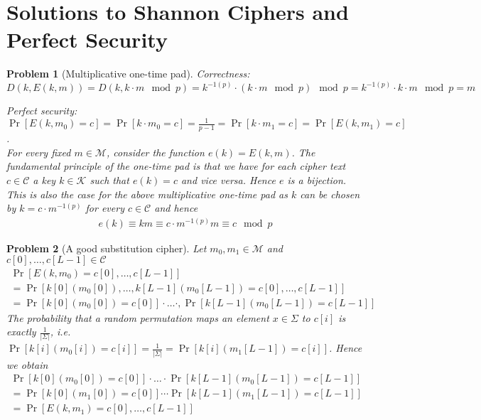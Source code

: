 \documentclass[USenglish,a4paper,12pt]{scrartcl}
\author{Kim Klein}
\date{April 2019}
\theoremstyle{break}
\newtheorem{exerc}{Problem}
\begin{document}
\section*{Solutions to Shannon Ciphers and Perfect Security}



\begin{exerc}[Multiplicative one-time pad]
Correctness: $D(k,E(k,m))= D(k,k \cdot m \mod p) = k^{-1 (p)} \cdot (k \cdot m \mod p) \mod p = k^{-1 (p)} \cdot k \cdot m \mod p = m$


Perfect security: $\Pr[E(k,m_0) = c] = \Pr[k \cdot m_0 = c] = \frac{1}{p-1} = \Pr[k \cdot m_1 = c] = \Pr[E(k,m_1) = c]$.\\


For every fixed $m \in \mathcal{M}$, consider the function $e(k) = E(k,m)$.
The fundamental principle of the one-time pad is that we have for each cipher text $c \in \mathcal{C}$ a key $k \in \mathcal{K}$ such that $e(k) = c$ and vice versa. Hence $e$ is a bijection. This is also the case for the above multiplicative one-time pad as $k$ can be chosen by $k = c \cdot m^{-1 (p)}$ for every $c \in \mathcal{C}$ and hence
\begin{align*}
    e(k) \equiv km \equiv c \cdot m^{-1 (p)} m \equiv c \mod p
\end{align*}
\end{exerc}



\begin{exerc}[A good substitution cipher]
    Let $m_0,m_1 \in \mathcal{M}$ and $c[0] , \ldots , c[L-1] \in \mathcal{C}$
    \begin{align*}
        \Pr[E(k,m_0) = c[0] , \ldots , c[L-1]] \\= \Pr[k[0](m_0[0]), \ldots , k[L-1](m_0[L-1]) = c[0] , \ldots , c[L-1]] \\= \Pr[k[0](m_0[0]) = c[0]] \cdot \ldots \cdot, \Pr[k[L-1](m_0[L-1]) = c[L-1]]
    \end{align*}
    The probability that a random permutation maps an element $x \in \Sigma$ to $c[i]$ is exactly $\frac{1}{|\Sigma|}$, i.e. $\Pr[k[i](m_0[i]) = c[i]] = \frac{1}{|\Sigma|} = \Pr[k[i](m_1[L-1]) = c[i]]$.
    Hence we obtain
    \begin{align*}
     \Pr[k[0](m_0[0]) = c[0]] \cdot \ldots \cdot \Pr[k[L-1](m_0[L-1]) = c[L-1]] \\
     = \Pr[k[0](m_1[0]) = c[0]] \cdots \Pr[k[L-1](m_1[L-1]) = c[L-1]] \\
     = \Pr[E(k,m_1) = c[0] , \ldots , c[L-1]]
    \end{align*}
\end{exerc}
\end{document}
